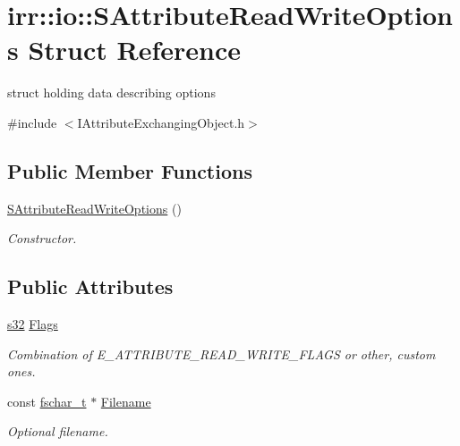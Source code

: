 \hypertarget{structirr_1_1io_1_1SAttributeReadWriteOptions}{}\section{irr\+:\+:io\+:\+:S\+Attribute\+Read\+Write\+Options Struct Reference}
\label{structirr_1_1io_1_1SAttributeReadWriteOptions}


struct holding data describing options  




{\ttfamily \#include $<$I\+Attribute\+Exchanging\+Object.\+h$>$}

\subsection*{Public Member Functions}
\begin{DoxyCompactItemize}
\item 
\mbox{\label{structirr_1_1io_1_1SAttributeReadWriteOptions_a8e25421df9794a7f138f816beee76575}} 
\hyperlink{structirr_1_1io_1_1SAttributeReadWriteOptions_a8e25421df9794a7f138f816beee76575}{S\+Attribute\+Read\+Write\+Options} ()
\begin{DoxyCompactList}\small\item\em Constructor. \end{DoxyCompactList}\end{DoxyCompactItemize}
\subsection*{Public Attributes}
\begin{DoxyCompactItemize}
\item 
\mbox{\label{structirr_1_1io_1_1SAttributeReadWriteOptions_a3982d8ac06deb65d238e1c0d693e1f8c}} 
\hyperlink{namespaceirr_ac66849b7a6ed16e30ebede579f9b47c6}{s32} \hyperlink{structirr_1_1io_1_1SAttributeReadWriteOptions_a3982d8ac06deb65d238e1c0d693e1f8c}{Flags}
\begin{DoxyCompactList}\small\item\em Combination of E\+\_\+\+A\+T\+T\+R\+I\+B\+U\+T\+E\+\_\+\+R\+E\+A\+D\+\_\+\+W\+R\+I\+T\+E\+\_\+\+F\+L\+A\+GS or other, custom ones. \end{DoxyCompactList}\item 
\mbox{\label{structirr_1_1io_1_1SAttributeReadWriteOptions_abf38b0f3ce47d9851d71ed5669e8a986}} 
const \hyperlink{namespaceirr_a813cca9bac9fa0c1427d89720a451460}{fschar\+\_\+t} $\ast$ \hyperlink{structirr_1_1io_1_1SAttributeReadWriteOptions_abf38b0f3ce47d9851d71ed5669e8a986}{Filename}
\begin{DoxyCompactList}\small\item\em Optional filename. \end{DoxyCompactList}\end{DoxyCompactItemize}


